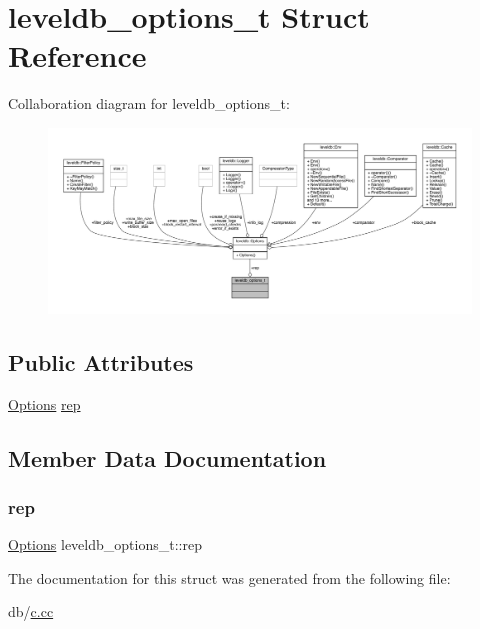 \hypertarget{structleveldb__options__t}{}\section{leveldb\+\_\+options\+\_\+t Struct Reference}
\label{structleveldb__options__t}


Collaboration diagram for leveldb\+\_\+options\+\_\+t\+:
\nopagebreak
\begin{figure}[H]
\begin{center}
\leavevmode
\includegraphics[width=350pt]{structleveldb__options__t__coll__graph}
\end{center}
\end{figure}
\subsection*{Public Attributes}
\begin{DoxyCompactItemize}
\item 
\mbox{\hyperlink{structleveldb_1_1_options}{Options}} \mbox{\hyperlink{structleveldb__options__t_a4f9a6dde987957ab489bf26c9d191df9}{rep}}
\end{DoxyCompactItemize}


\subsection{Member Data Documentation}
\mbox{\label{structleveldb__options__t_a4f9a6dde987957ab489bf26c9d191df9}} 
\subsubsection{\texorpdfstring{rep}{rep}}
{\footnotesize\ttfamily \mbox{\hyperlink{structleveldb_1_1_options}{Options}} leveldb\+\_\+options\+\_\+t\+::rep}



The documentation for this struct was generated from the following file\+:\begin{DoxyCompactItemize}
\item 
db/\mbox{\hyperlink{c_8cc}{c.\+cc}}\end{DoxyCompactItemize}
